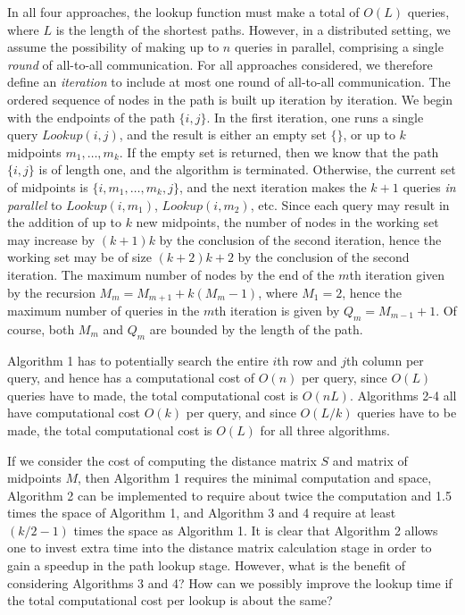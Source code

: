 \documentclass{article} %
\begin{document}
In all four approaches, the lookup function must make a total
of $O(L)$ queries, where $L$ is the length of the shortest paths.
However, in a distributed setting, we assume the possibility of making
up to $n$ queries in parallel, comprising a single \emph{round} of
all-to-all communication.  For all approaches considered, we therefore
define an \emph{iteration} to include at most one round of all-to-all
communication.  The ordered sequence of nodes in the path is built up
iteration by iteration.  We begin with the endpoints of the path $\{i,
j\}$.  In the first iteration, one runs a single query $Lookup(i, j)$,
and the result is either an empty set $\{\}$, or up to $k$ midpoints
$m_1,\hdots,m_k$.  If the empty set is returned, then we know that the
path $\{i, j\}$ is of length one, and the algorithm is terminated.
Otherwise, the current set of midpoints is $\{i, m_1, \hdots, m_k,
j\}$, and the next iteration makes the $k+1$ queries \emph{in
  parallel} to $Lookup(i, m_1)$, $Lookup(i, m_2)$, etc.  Since each
query may result in the addition of up to $k$ new midpoints, the
number of nodes in the working set may increase by $(k+1)k$ by the
conclusion of the second iteration, hence the working set may be of
size $(k+2)k + 2$ by the conclusion of the second iteration.  The
maximum number of nodes by the end of the $m$th iteration given by the
recursion $M_m = M_{m+1} + k(M_m-1)$, where $M_1 = 2$, hence the
maximum number of queries in the $m$th iteration is given by $Q_m =
M_{m-1}+1$.  Of course, both $M_m$ and $Q_m$ are bounded by the length
of the path.

Algorithm 1 has to potentially search the entire $i$th row and $j$th
column per query, and hence has a computational cost of $O(n)$ per
query, since $O(L)$ queries have to made, the total computational cost
is $O(nL)$.  Algorithms 2-4 all have computational cost $O(k)$ per
query, and since $O(L/k)$ queries have to be made, the total
computational cost is $O(L)$ for all three algorithms.

If we consider the cost of computing the distance matrix $S$ and
matrix of midpoints $M$, then Algorithm 1 requires the minimal
computation and space, Algorithm 2 can be implemented to require about
twice the computation and 1.5 times the space of Algorithm 1, and
Algorithm 3 and 4 require at least $(k/2 - 1)$ times the space as
Algorithm 1.  It is clear that Algorithm 2 allows one to invest extra
time into the distance matrix calculation stage in order to gain a
speedup in the path lookup stage.  However, what is the benefit of
considering Algorithms 3 and 4?  How can we possibly improve the
lookup time if the total computational cost per lookup is about the
same?
\end{document}
